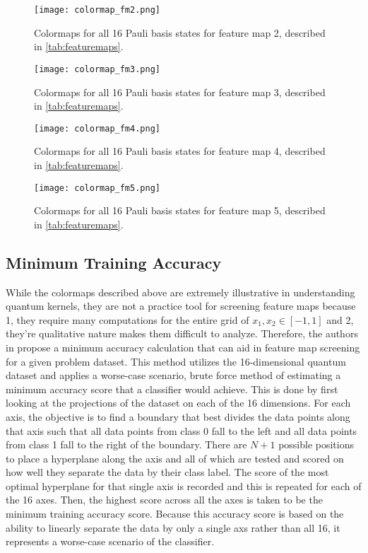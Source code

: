 \documentclass[
	a4paper, %
	10pt, %
	unnumberedsections, %
	twoside, %
]{LTJournalArticle}
\begin{document}
\begin{figure}
	\texttt{[image: colormap\_fm2.png]}
	\caption{Colormaps for all 16 Pauli basis states for feature map 2, described in \ref{tab:featuremaps}.}
	\label{fig:heatmap2}
\end{figure}

\begin{figure}
	\texttt{[image: colormap\_fm3.png]}
	\caption{Colormaps for all 16 Pauli basis states for feature map 3, described in \ref{tab:featuremaps}.}
	\label{fig:heatmap3}
\end{figure}

\begin{figure}
	\texttt{[image: colormap\_fm4.png]}
	\caption{Colormaps for all 16 Pauli basis states for feature map 4, described in \ref{tab:featuremaps}.}
	\label{fig:heatmap4}
\end{figure}

\begin{figure}
	\texttt{[image: colormap\_fm5.png]}
	\caption{Colormaps for all 16 Pauli basis states for feature map 5, described in \ref{tab:featuremaps}.}
	\label{fig:heatmap5}
\end{figure}

\subsection{Minimum Training Accuracy}
While the colormaps described above are extremely illustrative in understanding quantum kernels, they are not a practice tool for screening feature maps because 1, they require many 
computations for the entire grid of $x_1, x_2 \in [-1, 1]$ and 2, they're qualitative nature makes them difficult to analyze. Therefore, the authors in \autocite{suzuki2020analysis} propose 
a minimum accuracy calculation that can aid in feature map screening for a given problem dataset. This method utilizes the 16-dimensional quantum dataset and applies a worse-case scenario, 
brute force method of estimating a minimum accuracy score that a classifier would achieve. This is done by first looking at the projections of the dataset on each of the 16 dimensions. For 
each axis, the objective is to find a boundary that best divides the data points along that axis such that all data points from class 0 fall to the left and all data points from class 1 fall 
to the right of the boundary. There are $N+1$ possible positions to place a hyperplane along the axis and all of which are tested and scored on how well they separate the data by their class 
label. The score of the most optimal hyperplane for that single axis is recorded and this is repeated for each of the 16 axes. Then, the highest score across all the axes is taken to be the 
minimum training accuracy score. Because this accuracy score is based on the ability to linearly separate the data by only a single axs rather than all 16, it represents a worse-case scenario 
of the classifier.
\end{document}
